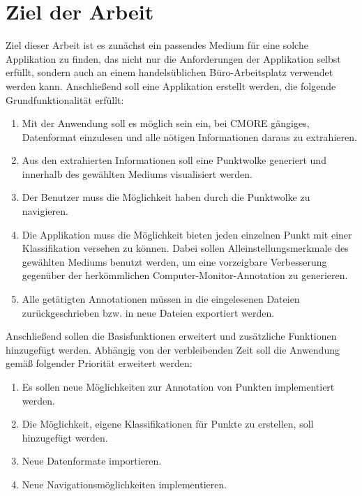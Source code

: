 \section{Ziel der Arbeit}
Ziel dieser Arbeit ist es zunächst ein passendes Medium für eine solche Applikation zu finden, das nicht nur die Anforderungen der Applikation selbst erfüllt, sondern auch an einem handelsüblichen Büro-Arbeitsplatz verwendet werden kann. Anschließend soll eine Applikation erstellt werden, die folgende Grundfunktionalität erfüllt:\\

\begin{enumerate}
\item Mit der Anwendung soll es möglich sein ein, bei CMORE gängiges, Datenformat einzulesen und alle nötigen Informationen daraus zu extrahieren.

\item Aus den extrahierten Informationen soll eine Punktwolke generiert und innerhalb des gewählten Mediums visualisiert werden.

\item Der Benutzer muss die Möglichkeit haben durch die Punktwolke zu navigieren.

\item Die Applikation muss die Möglichkeit bieten jeden einzelnen Punkt mit einer Klassifikation versehen zu können. Dabei sollen Alleinstellungsmerkmale des gewählten Mediums benutzt werden, um eine vorzeigbare Verbesserung gegenüber der herkömmlichen Computer-Monitor-Annotation zu generieren. 

\item Alle getätigten Annotationen müssen in die eingelesenen Dateien zurückgeschrieben bzw. in neue Dateien exportiert werden.
\end{enumerate}

Anschließend sollen die Basisfunktionen erweitert und zusätzliche Funktionen hinzugefügt werden. Abhängig von der verbleibenden Zeit soll die Anwendung gemäß folgender Priorität erweitert werden:\\

\begin{enumerate}
\item Es sollen neue Möglichkeiten zur Annotation von Punkten implementiert werden.

\item Die Möglichkeit, eigene Klassifikationen für Punkte zu erstellen, soll hinzugefügt werden.

\item Neue Datenformate importieren.

\item Neue Navigationsmöglichkeiten implementieren.
\end{enumerate}

